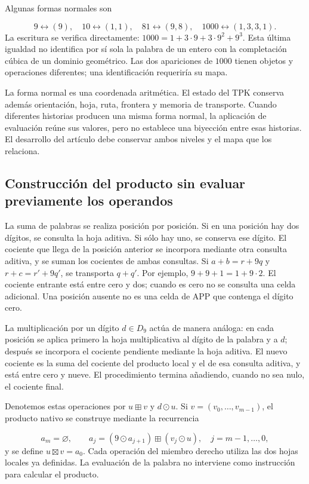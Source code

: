 Algunas formas normales son

\[
9\leftrightarrow(9),\quad
10\leftrightarrow(1,1),\quad
81\leftrightarrow(9,8),\quad
1000\leftrightarrow(1,3,3,1).
\]
La escritura se verifica directamente: $1000=1+3\cdot9+3\cdot9^2+9^3$. Esta última igualdad no identifica por sí sola la palabra de un entero con la completación cúbica de un dominio geométrico. Las dos apariciones de $1000$ tienen objetos y operaciones diferentes; una identificación requeriría su mapa.

La forma normal es una coordenada aritmética. El estado del TPK conserva además orientación, hoja, ruta, frontera y memoria de transporte. Cuando diferentes historias producen una misma forma normal, la aplicación de evaluación reúne sus valores, pero no establece una biyección entre esas historias. El desarrollo del artículo debe conservar ambos niveles y el mapa que los relaciona.

\subsection{Construcción del producto sin evaluar previamente los operandos}
La suma de palabras se realiza posición por posición. Si en una posición hay dos dígitos, se consulta la hoja aditiva. Si sólo hay uno, se conserva ese dígito. El cociente que llega de la posición anterior se incorpora mediante otra consulta aditiva, y se suman los cocientes de ambas consultas. Si \(a+b=r+9q\) y \(r+c=r'+9q'\), se transporta \(q+q'\). Por ejemplo, \(9+9+1=1+9\cdot2\). El cociente entrante está entre cero y dos; cuando es cero no se consulta una celda adicional. Una posición ausente no es una celda de APP que contenga el dígito cero.

La multiplicación por un dígito $d\in D_9$ actúa de manera análoga: en cada posición se aplica primero la hoja multiplicativa al dígito de la palabra y a $d$; después se incorpora el cociente pendiente mediante la hoja aditiva. El nuevo cociente es la suma del cociente del producto local y el de esa consulta aditiva, y está entre cero y nueve. El procedimiento termina añadiendo, cuando no sea nulo, el cociente final.

Denotemos estas operaciones por $u\boxplus v$ y $d\odot u$. Si $v=(v_0,\ldots,v_{m-1})$, el producto nativo se construye mediante la recurrencia

\[
a_m=\varnothing,\qquad
a_j=(9\odot a_{j+1})\boxplus(v_j\odot u),
\quad j=m-1,\ldots,0,
\]
y se define $u\boxtimes v=a_0$. Cada operación del miembro derecho utiliza las dos hojas locales ya definidas. La evaluación de la palabra no interviene como instrucción para calcular el producto.

